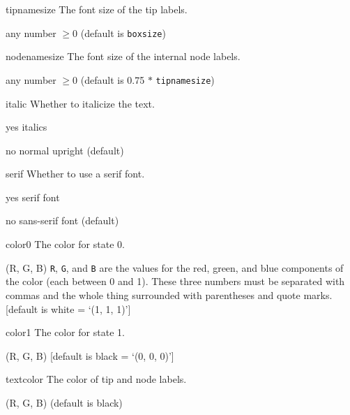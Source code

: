 \documentclass[10pt]{article}
\begin{document}
\begin{optdescrip}
	\item[tipnamesize] The font size of the tip labels.
		\begin{valdescrip}
			\item[]  any number $\ge 0$ (default is \texttt{boxsize})
		\end{valdescrip}

	\item[nodenamesize] The font size of the internal node labels.
		\begin{valdescrip}
			\item[]  any number $\ge 0$ (default is 0.75 $*$ \texttt{tipnamesize})
		\end{valdescrip}

	\item[italic] Whether to italicize the text.
		\begin{valdescrip}
			\item[yes] italics
			\item[no] normal upright (default)
		\end{valdescrip}

	\item[serif] Whether to use a serif font.
		\begin{valdescrip}
			\item[yes] serif font
			\item[no] sans-serif font (default)
		\end{valdescrip}


	\item[color0] The color for state 0.
		\begin{valdescrip}
		\item[(R, G, B)] \texttt{R}, \texttt{G}, and \texttt{B} are the values for the red, green, and blue components of the color (each between 0 and 1).  These three numbers must be separated with commas and the whole thing surrounded with parentheses and quote marks.  [default is white = `(1, 1, 1)']
		\end{valdescrip}

	\item[color1] The color for state 1.
		\begin{valdescrip}
			\item[(R, G, B)] [default is black = `(0, 0, 0)']
		\end{valdescrip}

	\item[textcolor] The color of tip and node labels.
		\begin{valdescrip}
			\item[(R, G, B)] (default is black)
		\end{valdescrip}


\end{optdescrip}
\end{document}
